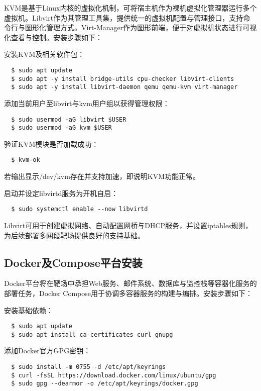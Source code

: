 \documentclass[lang=cn,10pt]{elegantbook}
\begin{document}
KVM是基于Linux内核的虚拟化机制，可将宿主机作为裸机虚拟化管理器运行多个虚拟机。Libvirt作为其管理工具集，提供统一的虚拟机配置与管理接口，支持命令行与图形化管理方式。Virt-Manager作为图形前端，便于对虚拟机状态进行可视化查看与控制。安装步骤如下：

安装KVM及相关软件包：

\begin{verbatim}
  $ sudo apt update
  $ sudo apt -y install bridge-utils cpu-checker libvirt-clients 
  $ sudo apt -y install libvirt-daemon qemu qemu-kvm virt-manager
\end{verbatim}

添加当前用户至libvirt与kvm用户组以获得管理权限：

\begin{verbatim}
  $ sudo usermod -aG libvirt $USER
  $ sudo usermod -aG kvm $USER
\end{verbatim}

验证KVM模块是否加载成功：

\begin{verbatim}
  $ kvm-ok
\end{verbatim}

若输出显示/dev/kvm存在并支持加速，即说明KVM功能正常。

启动并设定libvirtd服务为开机自启：

\begin{verbatim}
  $ sudo systemctl enable --now libvirtd
\end{verbatim}

Libvirt可用于创建虚拟网络、自动配置网桥与DHCP服务，并设置iptables规则，为后续部署多网段靶场提供良好的支持基础。

\subsection{Docker及Compose平台安装}

Docker平台将在靶场中承担Web服务、邮件系统、数据库与监控栈等容器化服务的部署任务，Docker Compose用于协调多容器服务的构建与编排。安装步骤如下：

安装基础依赖：

\begin{verbatim}
  $ sudo apt update
  $ sudo apt install ca-certificates curl gnupg
\end{verbatim}

添加Docker官方GPG密钥：

\begin{verbatim}
  $ sudo install -m 0755 -d /etc/apt/keyrings
  $ curl -fsSL https://download.docker.com/linux/ubuntu/gpg
  $ sudo gpg --dearmor -o /etc/apt/keyrings/docker.gpg
\end{verbatim}
\end{document}
